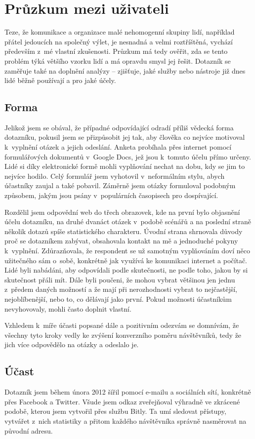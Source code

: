 \documentclass[12pt,oneside,final]{fithesis2}
\begin{document}
\section{Průzkum mezi uživateli}\label{poll}
Teze, že komunikace a organizace malé nehomogenní skupiny lidí, například přátel jedoucích na společný výlet, je nesnadná a velmi roztříštěná, vychází především z~mé vlastní zkušenosti. Průzkum má tedy ověřit, zda se tento problém týká většího vzorku lidí a má opravdu smysl jej řešit. Dotazník se zaměřuje také na doplnění analýzy -- zjišťuje, jaké služby nebo nástroje již dnes lidé běžně používají a pro jaké účely.

\subsection{Forma}
Jelikož jsem se obával, že případné odpovídající odradí příliš vědecká forma dotazníku, pokusil jsem se přizpůsobit jej tak, aby člověka co nejvíce motivoval k~vyplnění otázek a jejich odeslání. Anketa probíhala přes internet pomocí formulářových dokumentů v~Google Docs, jež jsou k~tomuto účelu přímo určeny. Lidé si díky elektronické formě mohli vyplňování nechat na dobu, kdy se jim to nejvíce hodilo. Celý formulář jsem vyhotovil v~neformálním stylu, abych účastníky zaujal a také pobavil. Záměrně jsem otázky formuloval podobným způsobem, jakým jsou psány  v~populárních časopisech pro dospívající.

Rozdělil jsem odpovědní web do třech obrazovek, kde na první bylo objasnění účelu dotazníku, na druhé dvanáct otázek v~podobě scénářů a na poslední straně několik dotazů spíše statistického charakteru. Úvodní strana shrnovala důvody proč se dotazníkem zabývat, obsahovala kontakt na mě a jednoduché pokyny k~vyplnění. Zdůrazňovala, že respondent se už samotným vyplňováním doví něco užitečného sám o~sobě, konkrétně jak využívá ke komunikaci internet a počítač. Lidé byli nabádáni, aby odpovídali podle skutečnosti, ne podle toho, jakou by si skutečnost přáli mít. Dále byli poučeni, že mohou vybrat většinou jen jednu z~předem daných možností a že mají při nerozhodnosti vybrat to nejčastější, nejoblíbenější, nebo to, co dělávají jako první. Pokud možnosti účastníkům nevyhovovaly, mohli často doplnit vlastní.

Vzhledem k~míře účasti popsané dále a pozitivním odezvám se domnívám, že všechny tyto kroky vedly ke zvýšení konverzního poměru návštěvníků, tedy že jich více odpovědělo na otázky a odeslalo je.

\subsection{Účast}\label{attendance}
Dotazník jsem během února 2012 šířil pomocí e-mailu a sociálních sítí, konkrétně přes Facebook a Twitter. Všude jsem odkaz zveřejňoval výhradně ve zkrácené podobě, kterou jsem vytvořil přes službu Bitly. Ta umí sledovat přístupy, vytvářet z~nich statistiky a přitom každého návštěvníka správně nasměrovat na původní adresu.
\end{document}

